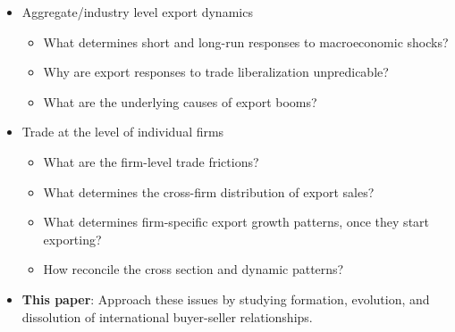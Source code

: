\documentclass[notes=show]{beamer}
\begin{document}
\begin{frame}%


\begin{itemize}
\item Aggregate/industry level export dynamics

\begin{itemize}
\item What determines short and long-run responses to macroeconomic shocks?

\item Why are export responses to trade liberalization unpredicable?

\item What are the underlying causes of export booms?
\end{itemize}
\end{itemize}

\pause%

\begin{itemize}
\item Trade at the level of individual firms

\begin{itemize}
\item What are the firm-level trade frictions?

\item What determines the cross-firm distribution of export sales?

\item What determines firm-specific export growth patterns, once they start
exporting?

\item How reconcile the cross section and dynamic patterns?
\end{itemize}
\end{itemize}

\pause%

\begin{itemize}
\item \textbf{This paper}: Approach these issues by studying formation,
evolution, and dissolution of international buyer-seller relationships.
\end{itemize}

\end{frame}%
\end{document}
